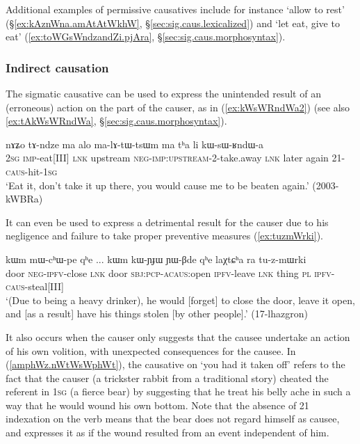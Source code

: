 Additional examples of permissive causatives include for instance   `allow to rest' (§\ref{ex:kAznWna.amAtAtWkhW}, §\ref{sec:sig.caus.lexicalized}) and  `let eat, give to eat' (\ref{ex:toWGsWndzandZi.pjAra}, §\ref{sec:sig.caus.morphosyntax}).
 
\subsubsection{Indirect causation} \label{sec:sig.caus.indirect}
The sigmatic causative can be used to express the unintended result of an (erroneous) action on the part of the causer,  as in (\ref{ex:kWsWRndWa2}) (see also \ref{ex:tAkWsWRndWa}, §\ref{sec:sig.caus.morphosyntax}).

\begin{exe}
\ex \label{ex:kWsWRndWa2}
\gll  nɤʑo tɤ-ndze ma alo ma-lɤ-tɯ-tsɯm ma tʰa li kɯ-sɯ-ʁndɯ-a \\
\textsc{2sg} \textsc{imp}-eat[III] \textsc{lnk} upstream \textsc{neg}-\textsc{imp}:\textsc{upstream}-2-take.away \textsc{lnk} later again 2\fl{}1-\textsc{caus}-hit-\textsc{1sg} \\
\glt  `Eat it, don't take it up there, you would cause me to be beaten again.' (2003-kWBRa)
\end{exe}

It can even be used to express a detrimental result for the causer due to his negligence and failure to take proper preventive measures (\ref{ex:tuzmWrki}).
\largerpage
\begin{exe}
	\ex \label{ex:tuzmWrki}
	\gll kɯm mɯ-cʰɯ-pe qʰe ... kɯm kɯ-ɲɟɯ ɲɯ-βde qʰe laχtɕʰa ra tu-z-mɯrki \\
	door \textsc{neg}-\textsc{ipfv}-close \textsc{lnk} {  } door \textsc{sbj}:\textsc{pcp}-\textsc{acaus}:open \textsc{ipfv}-leave \textsc{lnk} thing \textsc{pl} \textsc{ipfv}-\textsc{caus}-steal[III] \\
	\glt  `(Due to being a heavy drinker), he would [forget] to close the door, leave it open, and [as a result] have his things stolen [by other people].' (17-lhazgron)
\end{exe}

It also occurs when the causer only suggests that the causee undertake an action of his own volition, with unexpected consequences for the causee. In (\ref{amphWz.nWtWsWphWt}), the causative on  `you had it taken off' refers to the fact that the causer (a trickster rabbit from a traditional story) cheated the referent in \textsc{1sg} (a fierce bear) by suggesting that he treat his belly ache in such a way that he would wound his own bottom. Note that the absence of 2\fl{}1 indexation on the verb  means that the bear does not regard himself as causee, and expresses it as if the wound resulted from an event independent of him.

